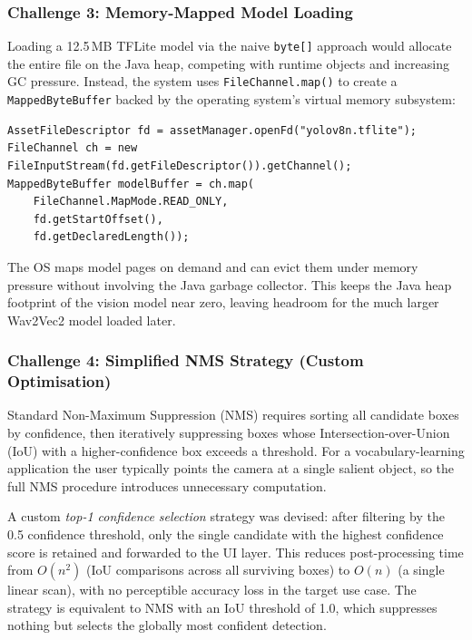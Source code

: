 \documentclass[a4paper, 12pt]{article}
\begin{document}
    \subsubsection{Challenge 3: Memory-Mapped Model Loading}

    Loading a 12.5\,MB TFLite model via the naive \texttt{byte[]} approach would allocate the entire file on the Java heap, competing with runtime objects and increasing GC pressure. Instead, the system uses \texttt{FileChannel.map()} to create a \texttt{MappedByteBuffer} backed by the operating system's virtual memory subsystem:

\begin{verbatim}
AssetFileDescriptor fd = assetManager.openFd("yolov8n.tflite");
FileChannel ch = new FileInputStream(fd.getFileDescriptor()).getChannel();
MappedByteBuffer modelBuffer = ch.map(
    FileChannel.MapMode.READ_ONLY,
    fd.getStartOffset(),
    fd.getDeclaredLength());
\end{verbatim}

    The OS maps model pages on demand and can evict them under memory pressure without involving the Java garbage collector. This keeps the Java heap footprint of the vision model near zero, leaving headroom for the much larger Wav2Vec2 model loaded later.

    \subsubsection{Challenge 4: Simplified NMS Strategy (Custom Optimisation)}

    Standard Non-Maximum Suppression (NMS) requires sorting all candidate boxes by confidence, then iteratively suppressing boxes whose Intersection-over-Union (IoU) with a higher-confidence box exceeds a threshold. For a vocabulary-learning application the user typically points the camera at a single salient object, so the full NMS procedure introduces unnecessary computation.

    A custom \emph{top-1 confidence selection} strategy was devised: after filtering by the 0.5 confidence threshold, only the single candidate with the highest confidence score is retained and forwarded to the UI layer. This reduces post-processing time from $O(n^2)$ (IoU comparisons across all surviving boxes) to $O(n)$ (a single linear scan), with no perceptible accuracy loss in the target use case. The strategy is equivalent to NMS with an IoU threshold of 1.0, which suppresses nothing but selects the globally most confident detection.
\end{document}
